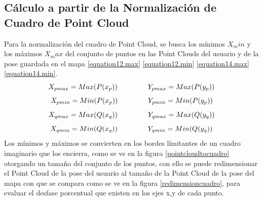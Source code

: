 \subsection{Cálculo a partir de la Normalización de Cuadro de Point Cloud}

Para la normalización del cuadro de Point Cloud, se busca los mínimos $X_min$ y los máximos $X_max$ del conjunto de puntos en las Point Clouds del usuario y de la pose guardada en el mapa \ref{equation12.max} \ref{equation12.min} \ref{equation14.max} \ref{equation14.min}.
\begin{equation}
X_{pmax} = Max(P(x_p)) \hspace{15mm} Y_{pmax} = Max(P(y_p))
\label{equation12.max}
\end{equation}
\begin{equation}
X_{pmin} = Min(P(x_p)) \hspace{15mm} Y_{pmin} = Min(P(y_p))
\label{equation12.min}
\end{equation}
\begin{equation}
X_{qmax} = Max(Q(x_q)) \hspace{15mm} Y_{qmax} = Max(Q(y_q))
\label{equation14.max}
\end{equation}
\begin{equation}
X_{qmin} = Min(Q(x_q)) \hspace{15mm} Y_{qmin} = Min(Q(y_q))
\label{equation14.min}
\end{equation}
Los mínimos y máximos se convierten en los bordes límitantes de un cuadro imaginario que los encierra, como se ve en la figura \ref{pointcloudtocuadro} otorgando un tamaño del conjunto de los puntos, con ello se puede redimensionar el Point Cloud de la pose del usuario al tamaño de la Point Cloud de la pose del mapa con que se compara como se ve en la figura \ref{redimensioncuadro}, para evaluar el desfase porcentual que existen en los ejes x,y de cada punto.

